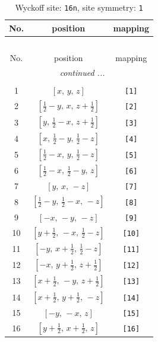 \documentclass[fleqn,8pt]{jsarticle}
\begin{document}
\begin{longtable}{ccc}
\caption{Wyckoff site: {\tt 16n}, site symmetry: {\tt 1}}
 \\
 \hline \hline
No. & position & mapping \\ \hline \endfirsthead

\multicolumn{2}{l}{\tablename\ \thetable{}} \\
 \hline \hline
No. & position & mapping \\ \hline \endhead

 \hline \hline
\multicolumn{2}{r}{\footnotesize\it continued ...} \\ \endfoot

 \hline \hline
\multicolumn{2}{r}{} \\ \endlastfoot

1 & $\left[ x,\, y,\, z \right]$ & {\tt [1]} \\ \hline
2 & $\left[ \frac{1}{2} - y,\, x,\, z + \frac{1}{2} \right]$ & {\tt [2]} \\ \hline
3 & $\left[ y,\, \frac{1}{2} - x,\, z + \frac{1}{2} \right]$ & {\tt [3]} \\ \hline
4 & $\left[ x,\, \frac{1}{2} - y,\, \frac{1}{2} - z \right]$ & {\tt [4]} \\ \hline
5 & $\left[ \frac{1}{2} - x,\, y,\, \frac{1}{2} - z \right]$ & {\tt [5]} \\ \hline
6 & $\left[ \frac{1}{2} - x,\, \frac{1}{2} - y,\, z \right]$ & {\tt [6]} \\ \hline
7 & $\left[ y,\, x,\, - z \right]$ & {\tt [7]} \\ \hline
8 & $\left[ \frac{1}{2} - y,\, \frac{1}{2} - x,\, - z \right]$ & {\tt [8]} \\ \hline
9 & $\left[ - x,\, - y,\, - z \right]$ & {\tt [9]} \\ \hline
10 & $\left[ y + \frac{1}{2},\, - x,\, \frac{1}{2} - z \right]$ & {\tt [10]} \\ \hline
11 & $\left[ - y,\, x + \frac{1}{2},\, \frac{1}{2} - z \right]$ & {\tt [11]} \\ \hline
12 & $\left[ - x,\, y + \frac{1}{2},\, z + \frac{1}{2} \right]$ & {\tt [12]} \\ \hline
13 & $\left[ x + \frac{1}{2},\, - y,\, z + \frac{1}{2} \right]$ & {\tt [13]} \\ \hline
14 & $\left[ x + \frac{1}{2},\, y + \frac{1}{2},\, - z \right]$ & {\tt [14]} \\ \hline
15 & $\left[ - y,\, - x,\, z \right]$ & {\tt [15]} \\ \hline
16 & $\left[ y + \frac{1}{2},\, x + \frac{1}{2},\, z \right]$ & {\tt [16]} \\
\end{longtable}
\end{document}
